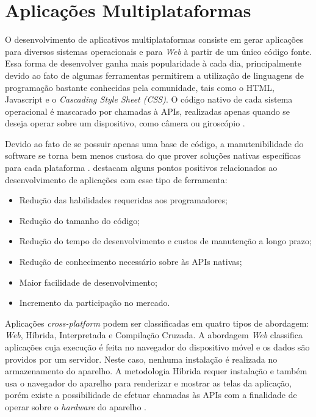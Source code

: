 \section{Aplicações Multiplataformas}

O desenvolvimento de aplicativos multiplataformas consiste em gerar aplicações para diversos sistemas operacionais e para \textit{Web} à partir de um único código fonte. Essa forma de desenvolver ganha mais popularidade à cada dia, principalmente devido ao fato de algumas ferramentas permitirem a utilização de linguagens de programação bastante conhecidas pela comunidade, tais como o HTML, Javascript e o \textit{Cascading Style Sheet (CSS)}. O código nativo de cada sistema operacional é mascarado por chamadas à APIs, realizadas apenas quando se deseja operar sobre um dispositivo, como câmera ou giroscópio \cite{raj2012study, palmieri2012comparison, dalmasso2013survey}.

Devido ao fato de se possuir apenas uma base de código, a manutenibilidade do software se torna bem menos custosa do que prover soluções nativas específicas para cada plataforma \cite{raj2012study}.  destacam alguns pontos positivos relacionados ao desenvolvimento de aplicações com esse tipo de ferramenta:

\begin{itemize}
\item Redução das habilidades requeridas aos programadores;
\item Redução do tamanho do código;
\item Redução do tempo de desenvolvimento e custos de manutenção a longo prazo;
\item Redução de conhecimento necessário sobre às APIs nativas;
\item Maior facilidade de desenvolvimento;
\item Incremento da participação no mercado.
\end{itemize}


Aplicações \textit{cross-platform} podem ser classificadas em quatro tipos de abordagem: \textit{Web}, Híbrida, Interpretada e Compilação Cruzada. A abordagem \textit{Web} classifica aplicações cuja execução é feita no navegador do dispositivo móvel e os dados são providos por um servidor. Neste caso, nenhuma instalação é realizada no armazenamento do aparelho. A metodologia Híbrida requer instalação e também usa o navegador do aparelho para renderizar e mostrar as telas da aplicação, porém existe a possibilidade de efetuar chamadas às APIs com a finalidade de operar sobre o \textit{hardware} do aparelho \cite{raj2012study, dalmasso2013survey}.

